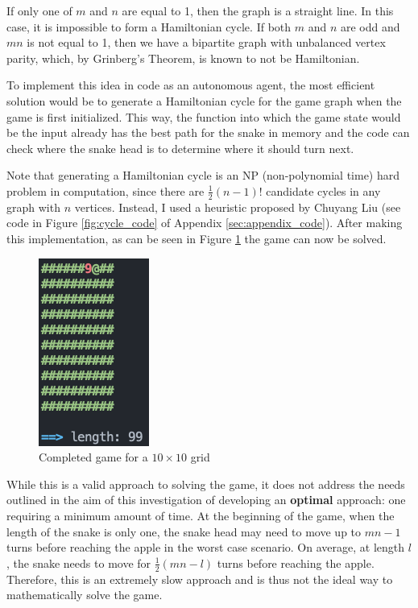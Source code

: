\documentclass[12pt]{article}
\begin{document}
If only one of $m$ and $n$ are equal to 1, then the graph is a straight line. In this case, it is impossible to form a Hamiltonian cycle. If both $m$ and $n$ are odd and $mn$ is not equal to 1, then we have a bipartite graph with unbalanced vertex parity, which, by Grinberg's Theorem, is known to not be Hamiltonian.

To implement this idea in code as an autonomous agent, the most efficient solution would be to generate a Hamiltonian cycle for the game graph when the game is first initialized. This way, the function into which the game state would be the input already has the best path for the snake in memory and the code can check where the snake head is to determine where it should turn next.

Note that generating a Hamiltonian cycle is an NP (non-polynomial time) hard problem in computation, since there are $\frac{1}{2} (n-1)!$ candidate cycles in any graph with $n$ vertices. Instead, I used a heuristic proposed by Chuyang Liu (see code in Figure \ref{fig:cycle_code} of Appendix \ref{sec:appendix_code}). After making this implementation, as can be seen in Figure \ref{fig:finished_cycle} the game can now be solved.

\begin{figure}[!h]
\centering
	\includegraphics[scale=0.6]{finished_cycle.png}
	\caption{Completed game for a $10 \times 10$ grid}
	\label{fig:finished_cycle}
\end{figure}

While this is a valid approach to solving the game, it does not address the needs outlined in the aim of this investigation of developing an \textbf{optimal} approach: one requiring a minimum amount of time. At the beginning of the game, when the length of the snake is only one, the snake head may need to move up to $mn - 1$ turns before reaching the apple in the worst case scenario. On average, at length $l$, the snake needs to move for $\frac{1}{2} (mn-l)$ turns before reaching the apple. Therefore, this is an extremely slow approach and is thus not the ideal way to mathematically solve the game.
\end{document}
